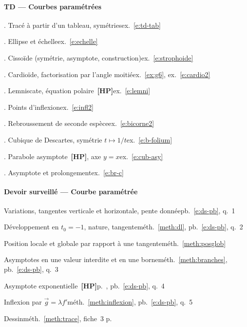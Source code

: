\documentclass[a4paper,11pt]{article}
\numberwithin{equation}{section}
\numberwithin{figure}{section}
\numberwithin{table}{section}
\theoremstyle{enonce}
\theoremstyle{exemple}
\theoremstyle{remarque}
\newcommand{\HP}{\,{\sffamily\bfseries\scriptsize\textcolor{Brique}{[HP]}}}
\begin{document}
{\paragraph{TD --- Courbes paramétrées}
. Tracé à partir d'un tableau, symétries\dotfill ex.~\ref{e:td-tab}\par
{}. Ellipse et échelle\dotfill ex.~\ref{e:echelle}\par
{}. Cissoïde (symétrie, asymptote, construction)\dotfill ex.~\ref{e:strophoide}\par
{}. Cardioïde, factorisation par l'angle moitié\dotfill ex.~\ref{ex:g6}, ex.~\ref{e:cardio2}\par
{}. Lemniscate, équation polaire \HP\dotfill ex.~\ref{e:lemni}\par
{}. Points d'inflexion\dotfill ex.~\ref{e:infl2}\par
{}. Rebroussement de seconde espèce\dotfill ex.~\ref{e:bicorne2}\par
{}. Cubique de Descartes, symétrie $t\mapsto1/t$\dotfill ex.~\ref{e:b-folium}\par
{}. Parabole asymptote \HP, axe $y=x$\dotfill ex.~\ref{e:cub-asy}\par
{}. Asymptote et prolongement\dotfill ex.~\ref{e:br-c}\par
\paragraph{Devoir surveillé --- Courbe paramétrée}
\noindent Variations, tangentes verticale et horizontale, pente donnée\dotfill pb.~\ref{e:ds-pb}, q.~1\par
\noindent Développement en $t_0=-1$, nature, tangente\dotfill méth.~\ref{meth:dl}, pb.~\ref{e:ds-pb}, q.~2\par
\noindent Position locale et globale par rapport à une tangente\dotfill méth.~\ref{meth:posglob}\par
\noindent Asymptotes en une valeur interdite et en une borne\dotfill méth.~\ref{meth:branches}, pb.~\ref{e:ds-pb}, q.~3\par
\noindent Asymptote exponentielle \HP\dotfill p.~\pageref{hp:courbe-asymptote}, pb.~\ref{e:ds-pb}, q.~4\par
\noindent Inflexion par $\vec g=\lambda f'$\dotfill méth.~\ref{meth:inflexion}, pb.~\ref{e:ds-pb}, q.~5\par
\noindent Dessin\dotfill méth.~\ref{meth:trace}, fiche~3 p.~\pageref{fiche:3}\par
}
\end{document}

